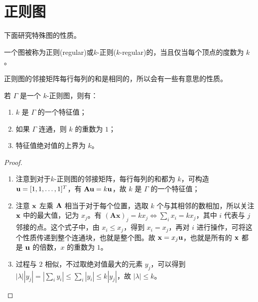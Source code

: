 
\section{正则图}

下面研究特殊图的性质。

\begin{definition}[正则图]
一个图被称为正则(regular)或$k$-正则($k$-regular)的，当且仅当每个顶点的度数为 $k$。
\end{definition}

正则图的邻接矩阵每行每列的和是相同的，所以会有一些有意思的性质。

\begin{theorem}[正则图特征值的性质]
若 $\Gamma$ 是一个 $k$-正则图，则有：
\begin{enumerate}
\item $k$ 是 $\Gamma$ 的一个特征值；
\item 如果 $\Gamma$ 连通，则 $k$ 的重数为 $1$；
\item 特征值绝对值的上界为 $k$。
\end{enumerate}
\end{theorem}
\begin{proof}
\begin{enumerate}
\item 注意到对于$k$-正则图的邻接矩阵，每行每列的和都为 $k$，可构造 $\textbf u = [1,1,\dots,1]^T$，有 $\textbf{Au} = k\textbf u$，故 $k$ 是 $\Gamma$ 的一个特征值；
\item 注意 $\textbf x$ 左乘 $\textbf A$ 相当于对于每个位置，选取 $k$ 个与其相邻的数相加，所以关注 $\textbf x$ 中的最大值，记为 $x_j$。有 $(\textbf{Ax})_j = k x_j \Leftrightarrow \sum_{i}x_i = k x_j$，其中 $i$ 代表与 $j$ 邻接的点。这个式子中，由 $x_i \le x_j$，得到 $x_i = x_j$，再对 $i$ 进行操作，可将这个性质传递到整个连通块，也就是整个图。故 $\textbf x = x_j \textbf u$，也就是所有的 $\textbf x$ 都是 $\textbf u$ 的倍数，$x$ 的重数为 $1$。
\item 过程与 $2$ 相似，不过取绝对值最大的元素 $y_j$，可以得到 $|\lambda||y_j| = |\sum_i y_i| \le \sum_i|y_i| \le k|y_j|$，故 $|\lambda| \le k$。
\end{enumerate}
\end{proof}

